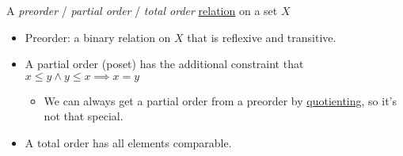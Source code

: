 
A \emph{preorder} / \emph{partial order} / \emph{total order} \href{doc/1 math/Seven Sketches in Compositionality/1 Chapter 1: Generative Effects/2 What is order/Relation}{relation} on a set $X$

\begin{itemize}
    \item Preorder: a binary relation on $X$ that is reflexive and transitive.
    \item A partial order (poset) has the additional constraint that $x \leq y \land y \leq x \implies x=y$
          \begin{itemize}\item We can always get a partial order from a preorder by \href{doc/1 math/Seven Sketches in Compositionality/1 Chapter 1: Generative Effects/2 What is order/Quotient}{quotienting}, so it's not that special.\end{itemize}
    \item A total order has all elements comparable.
  \end{itemize}